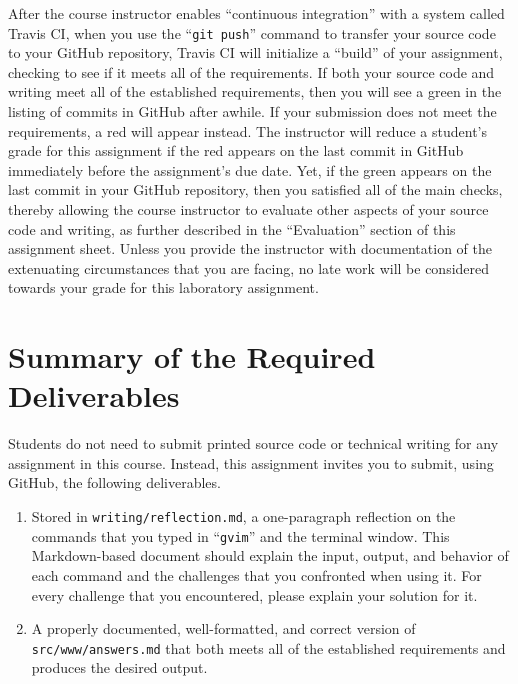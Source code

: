\documentclass[11pt]{article}
\newcommand{\mainprogramsource}{\lstinline{src/www/answers.md}}
\newcommand{\reflection}{\lstinline{writing/reflection.md}}
\newcommand{\gitpush}{\command{git push}}
\newcommand{\command}[1]{``\lstinline{#1}''}
\newcommand{\step}[1]{``{#1}''}
\newcommand{\checkmark}{\ding{51}}
\newcommand{\naughtmark}{\ding{55}}
\begin{document}
After the course instructor enables \step{continuous integration} with a system called Travis CI, when you use the
\gitpush{} command to transfer your source code to your GitHub repository, Travis CI will initialize a \step{build} of
your assignment, checking to see if it meets all of the requirements. If both your source code and writing meet all of
the established requirements, then you will see a green \checkmark{} in the listing of commits in GitHub after awhile.
If your submission does not meet the requirements, a red \naughtmark{} will appear instead. The instructor will reduce a
student's grade for this assignment if the red \naughtmark{} appears on the last commit in GitHub immediately before the
assignment's due date. Yet, if the green \checkmark{} appears on the last commit in your GitHub repository, then you
satisfied all of the main checks, thereby allowing the course instructor to evaluate other aspects of your source code
and writing, as further described in the \step{Evaluation} section of this assignment sheet. Unless you provide the
instructor with documentation of the extenuating circumstances that you are facing, no late work will be considered
towards your grade for this laboratory assignment.

\section*{Summary of the Required Deliverables}

\noindent Students do not need to submit printed source code or technical writing for any assignment in this course.
Instead, this assignment invites you to submit, using GitHub, the following deliverables.

\begin{enumerate}

\setlength{\itemsep}{0in}

\item Stored in \reflection{}, a one-paragraph reflection on the commands that you typed in \command{gvim} and the
  terminal window. This Markdown-based document should explain the input, output, and behavior of each command and the
  challenges that you confronted when using it. For every challenge that you encountered, please explain your solution
  for it.

\item A properly documented, well-formatted, and correct version of \mainprogramsource{} that both meets all of the
  established requirements and produces the desired output.

\end{enumerate}
\end{document}
